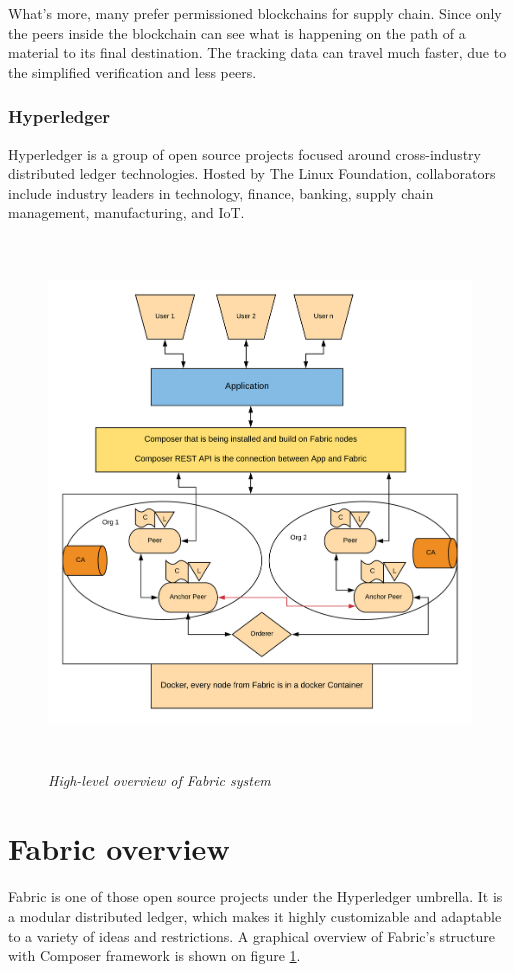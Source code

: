 \documentclass[a4paper,11pt]{report}
\begin{document}
What's more, many prefer permissioned blockchains for supply chain. Since only the peers inside the blockchain can see what is happening on the path of a material to its final destination. The tracking data can travel much faster, due to the simplified verification and less peers. 

\subsubsection{Hyperledger}
Hyperledger is a group of open source projects focused around cross-industry distributed ledger technologies. Hosted by The Linux Foundation, collaborators include industry leaders in technology, finance, banking, supply chain management, manufacturing, and IoT.


\begin{figure}[h]
\centering
  \includegraphics[height=14cm,width=16cm]{Flowdiagram.png}
  \caption{\textit{High-level overview of Fabric system}}
  \label{highleveloverview}
\end{figure}


\section{Fabric overview}
	Fabric is one of those open source projects under the Hyperledger umbrella. It is a modular distributed ledger, which makes it highly customizable and adaptable to a variety of ideas and restrictions. A graphical overview of Fabric's structure with Composer framework is shown on figure \ref{highleveloverview}.
	
\end{document}
